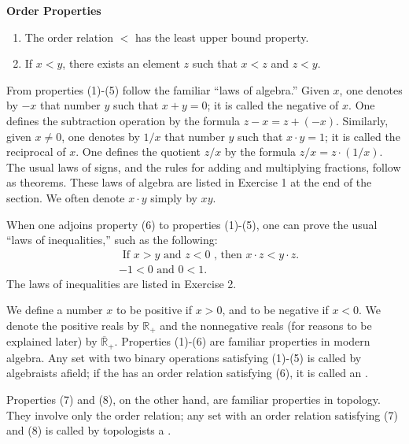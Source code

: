 \noindent\textbf{Order Properties}

\begin{enumerate}[nosep, leftmargin=*, label=(\arabic*), resume]
\item The order relation \(<\) has the least upper bound property.
\item If \(x < y\), there exists an element \(z\) such that \(x < z\) and \(z < y\).
\end{enumerate}

From properties (1)-(5) follow the familiar ``laws of algebra.'' 
Given \(x\), one denotes by \(- x\) that number \(y\) such that \(x + y = 0\); 
it is called the negative of \(x\). One defines the subtraction operation by 
the formula \(z - x = z + ({-x})\). Similarly, given \(x \neq 0\), 
one denotes by \(1/x\) that number \(y\) such that \(x \cdot y = 1\); 
it is called the reciprocal of \(x\). One defines the quotient \(z/x\) by 
the formula \(z/x = z \cdot ({1/x})\). The usual laws of signs, 
and the rules for adding and multiplying fractions, follow as theorems. 
These laws of algebra are listed in Exercise 1 at the end of the section. 
We often denote \(x \cdot y\) simply by \(xy\).

When one adjoins property (6) to properties (1)-(5), one can prove the 
usual ``laws of inequalities,'' such as the following:
\[
\begin{aligned}
&\text{ If }x > y\text{ and }z < 0\text{ , then }x \cdot z < y \cdot z\text{.} \\
&- 1 < 0\text{ and }0 < 1\text{.}
\end{aligned}
\]
The laws of inequalities are listed in Exercise 2.

We define a number \(x\) to be positive if \(x > 0\), and to be negative 
if \(x < 0\). We denote the positive reals by \(\mathbb{R}_{+}\) and 
the nonnegative reals (for reasons to be explained later) by 
\({\overline{\mathbb{R}}}_{+}\). Properties (1)-(6) are familiar properties 
in modern algebra. Any set with two binary operations satisfying (1)-(5) is 
called by algebraists afield; if the  has an order relation 
satisfying (6), it is called an .

Properties (7) and (8), on the other hand, are familiar properties in topology. 
They involve only the order relation; any set with an order relation satisfying (7) and (8) 
is called by topologists a .

